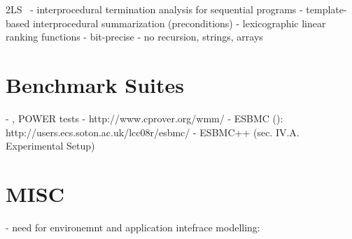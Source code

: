 2LS~\cite{Chen2017}
- interprocedural termination analysis for sequential programs
- template-based interprocedural summarization (preconditions)
- lexicographic linear ranking functions
- bit-precise
- no recursion, strings, arrays

\section{Benchmark Suites}

- \cite{Sarkar2011}, \cite{MadorHaim2012} POWER tests
- http://www.cprover.org/wmm/
- ESBMC (\cite{Cordeiro2011}): http://users.ecs.soton.ac.uk/lcc08r/esbmc/
- ESBMC++ \cite{Ramalho2016:19,6,27,.} (sec. IV.A. Experimental Setup)

\section{MISC}

- need for environemnt and application intefrace modelling: \cite{Cordeiro2016}


